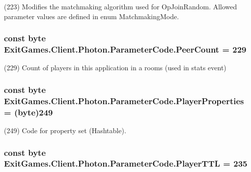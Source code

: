 (223) Modifies the matchmaking algorithm used for Op\+Join\+Random. Allowed parameter values are defined in enum Matchmaking\+Mode.

\subsubsection[{\texorpdfstring{Peer\+Count}{PeerCount}}]{\setlength{\rightskip}{0pt plus 5cm}const byte Exit\+Games.\+Client.\+Photon.\+Parameter\+Code.\+Peer\+Count = 229}\hypertarget{class_exit_games_1_1_client_1_1_photon_1_1_parameter_code_ace022047377b9cce0b571defc06a021e}{}\label{class_exit_games_1_1_client_1_1_photon_1_1_parameter_code_ace022047377b9cce0b571defc06a021e}


(229) Count of players in this application in a rooms (used in stats event)

\subsubsection[{\texorpdfstring{Player\+Properties}{PlayerProperties}}]{\setlength{\rightskip}{0pt plus 5cm}const byte Exit\+Games.\+Client.\+Photon.\+Parameter\+Code.\+Player\+Properties = (byte)249}\hypertarget{class_exit_games_1_1_client_1_1_photon_1_1_parameter_code_ab173474caabd7353e0477f3a04760204}{}\label{class_exit_games_1_1_client_1_1_photon_1_1_parameter_code_ab173474caabd7353e0477f3a04760204}


(249) Code for property set (Hashtable).

\subsubsection[{\texorpdfstring{Player\+T\+TL}{PlayerTTL}}]{\setlength{\rightskip}{0pt plus 5cm}const byte Exit\+Games.\+Client.\+Photon.\+Parameter\+Code.\+Player\+T\+TL = 235}\hypertarget{class_exit_games_1_1_client_1_1_photon_1_1_parameter_code_a90062be6045e858dfdefc63c6bb26cc9}{}\label{class_exit_games_1_1_client_1_1_photon_1_1_parameter_code_a90062be6045e858dfdefc63c6bb26cc9}


